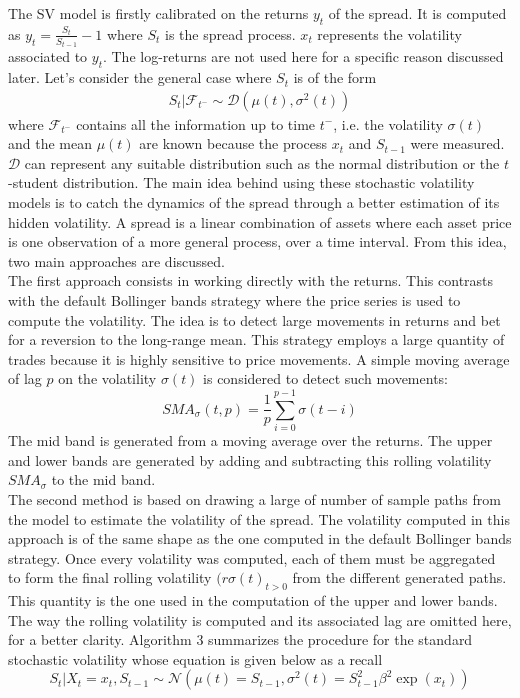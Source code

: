 \documentclass[11pt,a4,twosided,singlespacing,titlepagenumber=on]{scrreprt}
\numberwithin{equation}{chapter} %
\theoremstyle{remark}
\begin{document}
The SV model is firstly calibrated on the returns $y_t$ of the spread. It is computed as $y_t = \frac{S_t}{S_{t-1}}-1$ where $S_t$ is the spread process.
$x_t$ represents the volatility associated to $y_t$. The log-returns are not used here for a specific reason discussed later. Let's consider the general case where $S_t$ is of the form
\begin{align*}
S_t | \mathcal{F}_{t^-} \sim \mathcal{D}\left( \mu(t), \sigma^2(t) \right)
\end{align*}
where $\mathcal{F}_{t^-}$ contains all the information up to time $t^-$, i.e. the volatility $\sigma(t)$ and the mean $\mu(t)$ are known because the process $x_t$ and $S_{t-1}$ were measured. $\mathcal{D}$ can represent any suitable distribution such as the normal distribution or the $t$-student distribution.
The main idea behind using these stochastic volatility models is to catch the dynamics of the spread through a better estimation of its hidden volatility. A spread is a linear combination of assets where each asset price is one observation of a more general process, over a time interval. From this idea, two main approaches are discussed. \\

\noindent
The first approach consists in working directly with the returns. This contrasts with the default Bollinger bands strategy where the price series is used to compute the volatility. The idea is to detect large movements in returns and bet for a reversion to the long-range mean. This strategy employs a large quantity of trades because it is highly sensitive to price movements. A simple moving average of lag $p$ on the volatility $\sigma(t)$ is considered to detect such movements:
$$SMA_\sigma(t, p) = \frac{1}{p} \sum_{i=0}^{p-1}\sigma(t-i)$$
The mid band is generated from a moving average over the returns. The upper and lower bands are generated by adding and subtracting this rolling volatility $SMA_\sigma$ to the mid band. \\

\noindent
The second method is based on drawing a large of number of sample paths from the model to estimate the volatility of the spread. The volatility computed in this approach is of the same shape as the one computed in the default Bollinger bands strategy. Once every volatility was computed, each of them must be aggregated to form the final rolling volatility $(r\sigma(t)_{t>0}$ from the different generated paths. This quantity is the one used in the computation of the upper and lower bands. The way the rolling volatility is computed and its associated lag are omitted here, for a better clarity. Algorithm 3 summarizes the procedure for the standard stochastic volatility whose equation is given below as a recall
$$S_t | X_t = x_t, S_{t-1} \sim \mathcal{N}(\mu(t) = S_{t-1}, \sigma^2(t)= S_{t-1}^2 \beta^2 \exp(x_t))$$
\end{document}
